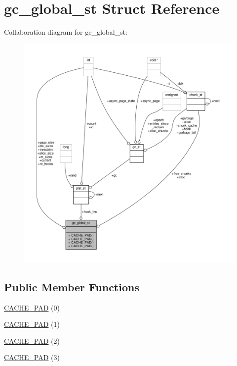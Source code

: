 \hypertarget{structgc__global__st}{\section{gc\-\_\-global\-\_\-st Struct Reference}
\label{structgc__global__st}
}


Collaboration diagram for gc\-\_\-global\-\_\-st\-:
\nopagebreak
\begin{figure}[H]
\begin{center}
\leavevmode
\includegraphics[width=350pt]{structgc__global__st__coll__graph}
\end{center}
\end{figure}
\subsection*{Public Member Functions}
\begin{DoxyCompactItemize}
\item 
\hyperlink{structgc__global__st_ad98d070da4526569b19dfb47361df168}{C\-A\-C\-H\-E\-\_\-\-P\-A\-D} (0)
\item 
\hyperlink{structgc__global__st_a2612f38877e6f57f1c884120185f73d1}{C\-A\-C\-H\-E\-\_\-\-P\-A\-D} (1)
\item 
\hyperlink{structgc__global__st_a9d3fac4cd1ba1283048ada9f1b38af08}{C\-A\-C\-H\-E\-\_\-\-P\-A\-D} (2)
\item 
\hyperlink{structgc__global__st_a830b588f9e700826040e5377cd2929f1}{C\-A\-C\-H\-E\-\_\-\-P\-A\-D} (3)
\end{DoxyCompactItemize}
